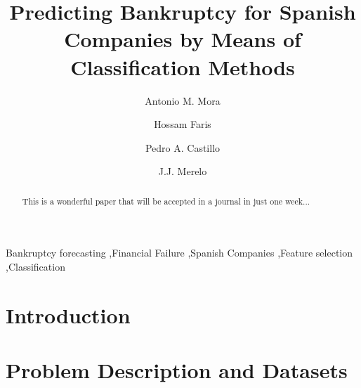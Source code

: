 \documentclass[a4paper,10pt,onecolumn,preprint,3p]{elsarticle}
\begin{document}

\title{Predicting Bankruptcy for Spanish Companies by Means of Classification Methods} 


\author[ugr]{Antonio M. Mora}
\author[abd]{Hossam Faris}
\author[ugr]{Pedro A. Castillo}
\author[ugr]{J.J. Merelo}


\address[ugr]{Department of Computer Architecture and Computer Technology, ETSIIT and CITIC \\
University of Granada, Granada, Spain. Tel: +34958241778. Fax: +34958248993}
\address[abd]{Business Information Technology Department, King Abdullah II School for Information Technology \\
The University of Jordan, Amman, Jordan}

\maketitle

\begin{abstract}
This is a wonderful paper that will be accepted in a journal in just one week...
\end{abstract}


\begin{keyword}
Bankruptcy forecasting \sep Financial Failure \sep Spanish Companies \sep Feature selection \sep Classification  
\end{keyword}


\section{Introduction}
\label{sec:intro}

\section{Problem Description and Datasets}
\label{sec:problem}
\end{document}
